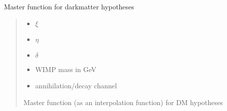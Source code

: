 \documentclass[letterpaper,10pt,english]{sphinxmanual}
\begin{document}
\begin{fulllineitems}
\label{\detokenize{diffsph.spectra:diffsph.spectra.synchrotron.Mst_DM}}
\pysigstartsignatures
{}
\pysigstopsignatures
\sphinxAtStartPar
Master function for dark\sphinxhyphen{}matter hypotheses
\begin{quote}\begin{description}
\begin{itemize}
\item {} 
\sphinxAtStartPar
{} \textendash{} \(\xi\)

\item {} 
\sphinxAtStartPar
{} \textendash{} \(\eta\)

\item {} 
\sphinxAtStartPar
{} \textendash{} \(\delta\)

\item {} 
\sphinxAtStartPar
{} \textendash{} WIMP mass in GeV

\item {} 
\sphinxAtStartPar
{} \textendash{} annihilation/decay channel

\end{itemize}

\sphinxAtStartPar
Master function (as an interpolation function) for DM hypotheses

\end{description}\end{quote}

\end{fulllineitems}

\end{document}
